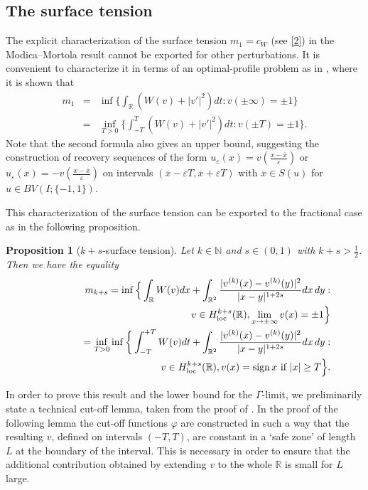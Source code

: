 \documentclass{article}
\newtheorem{proposition}[lemma]{Proposition}
\newcommand{\e}{\varepsilon}
\begin{document}
\subsection{The surface tension}
The explicit characterization of the surface tension $m_1=c_W$  (see \eqref{2}) in the Modica--Mortola result cannot be exported for other perturbations. It is convenient to characterize it in terms of an optimal-profile problem as in \cite{FT}, where it is shown that
\begin{eqnarray}\label{emme1} \nonumber
m_1&=&\inf\Big\{\int_{\mathbb R} (W(v)+|v'|^2)dt: v(\pm\infty)=\pm1\Big\}
\\
&=&\inf_{T>0} \Big\{\int_{-T}^T (W(v)+|v'|^2)dt: v(\pm T)=\pm1\Big\}.
\end{eqnarray}
Note that the second formula also gives an upper bound, suggesting the construction of recovery sequences of the form $u_\e(x)=v(\tfrac{x-\overline x}\e)$ or $u_\e(x)=-v(\tfrac{x-\overline x}\e)$ on intervals $(\overline x-\e T,\overline x+\e T)$ with $\overline x\in S(u)$ for $u\in BV(I;\{-1,1\})$.

 This characterization of the surface tension can be exported to the fractional case as in the following proposition.

\begin{proposition}[$k+s$-surface tension]\label{sut}
Let $k\in \mathbb N$ and $s\in (0,1)$ with $k+s>\frac12$. Then we have the equality
\begin{eqnarray}\label{emme}\nonumber
&&m_{k+s} =\inf\Big\{\int_{\mathbb R} W(v)dx+\int_{\mathbb R^2}\frac{|v^{(k)}(x)-v^{(k)}(y)|^2}{|x-y|^{1+2s}} dx\,dy :\\
&& \hskip4.5cm v\in H^{k+s}_{\rm loc}(\mathbb R), \lim_{x\to\pm\infty}v(x)=\pm1\Big\}\\
\label{emmetilde}\nonumber
&&\hskip1cm =\inf_{T>0} \inf\bigg\{\int_{-T}^{+T} W(v)dt +\int_{\mathbb R^2}\frac{|v^{(k)}(x)-v^{(k)}(y)|^2}{|x-y|^{1+2s}} dx\,dy :\\
&& \hskip4cm v\in H^{k+s}_{\rm loc}(\mathbb R), v(x)={\rm sign}\, x\hbox{ \rm if }|x| \ge T\Big\}.
\end{eqnarray}
\end{proposition}


In order to prove this result and the lower bound for the $\Gamma$-limit, we preliminarily state a technical cut-off  lemma, taken from the proof of \cite[Proposition 12]{Solci}. In the proof of the following lemma the cut-off functions $\varphi$ are constructed in such a way that the resulting $v$, defined on intervals $(-T,T)$, are constant in a `safe zone' of length $L$ at the boundary of the interval. This is necessary in order to ensure that the additional contribution obtained by extending $v$ to the whole $\mathbb R$ is small for $L$ large. 
\end{document}
